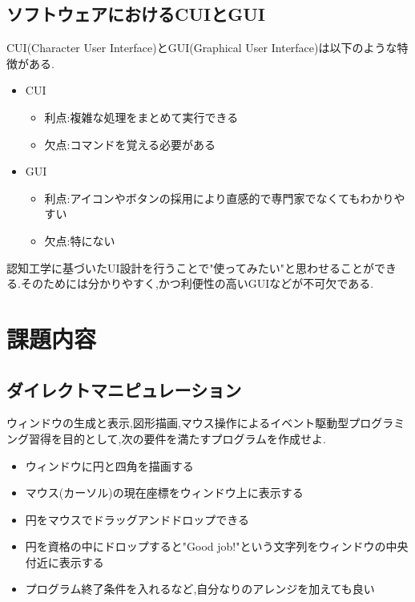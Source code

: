 \documentclass{jarticle}
\begin{document}
	\subsection{ソフトウェアにおけるCUIとGUI}

	CUI(Character User Interface)とGUI(Graphical User Interface)は以下のような特徴がある.
	\begin{itemize}
	\item CUI
		\begin{itemize}
		\item 利点:複雑な処理をまとめて実行できる
		\item 欠点:コマンドを覚える必要がある
		\end{itemize}
	\item GUI
		\begin{itemize}
		\item 利点:アイコンやボタンの採用により直感的で専門家でなくてもわかりやすい 
		\item 欠点:特にない
		\end{itemize}
	\end{itemize}
	認知工学に基づいたUI設計を行うことで"使ってみたい"と思わせることができる.そのためには分かりやすく,かつ利便性の高いGUIなどが不可欠である.


	\section{課題内容}
	\subsection{ダイレクトマニピュレーション}
	\label{subsec:kadai1}
	ウィンドウの生成と表示,図形描画,マウス操作によるイベント駆動型プログラミング習得を目的として,次の要件を満たすプログラムを作成せよ.

	\begin{itemize}

	\item ウィンドウに円と四角を描画する
	\item マウス(カーソル)の現在座標をウィンドウ上に表示する
	\item 円をマウスでドラッグアンドドロップできる
	\item 円を資格の中にドロップすると"Good job!"という文字列をウィンドウの中央付近に表示する
	\item プログラム終了条件を入れるなど,自分なりのアレンジを加えても良い

	\end{itemize}
\end{document}
